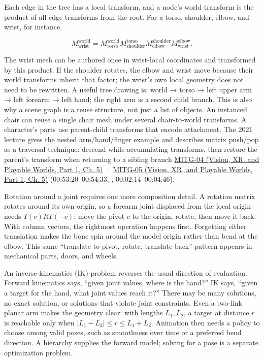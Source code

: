 Each edge in the tree has a local transform, and a node's world transform is the product of all edge transforms from the root. For a torso, shoulder, elbow, and wrist, for instance,

\[
M_{\mathrm{wrist}}^{\mathrm{world}}=
M_{\mathrm{torso}}^{\mathrm{world}}
M_{\mathrm{shoulder}}^{\mathrm{torso}}
M_{\mathrm{elbow}}^{\mathrm{shoulder}}
M_{\mathrm{wrist}}^{\mathrm{elbow}}.
\]

The wrist mesh can be authored once in wrist-local coordinates and transformed by this product. If the shoulder rotates, the elbow and wrist move because their world transforms inherit that factor; the wrist's own local geometry does not need to be rewritten. A useful tree drawing is: world → torso → left upper arm → left forearm → left hand; the right arm is a second child branch. This is also why a scene graph is a reuse structure, not just a list of objects. An instanced chair can reuse a single chair mesh under several chair-to-world transforms. A character's parts use parent-child transforms that encode attachment. The 2021 lecture gives the nested arm/hand/finger example and describes matrix push/pop as a traversal technique: descend while accumulating transforms, then restore the parent's transform when returning to a sibling branch \href{../07-Vision-XR-and-Playable-Worlds-P01/main.pdf\#nameddest=04-visual-computing-ii-ch036-mitg-04---transformations}{MITG-04 (Vision, XR, and Playable Worlds, Part 1, Ch. 5)} · \href{../07-Vision-XR-and-Playable-Worlds-P01/main.pdf\#nameddest=04-visual-computing-ii-ch036-mitg-05---hierarchical-modeling}{MITG-05 (Vision, XR, and Playable Worlds, Part 1, Ch. 5)} (00:53:20--00:54:33; , 00:02:14--00:04:46).

Rotation around a joint requires one more composition detail. A rotation matrix rotates around its own origin, so a forearm joint displaced from the local origin needs \(T(c)RT(-c)\): move the pivot \(c\) to the origin, rotate, then move it back. With column vectors, the rightmost operation happens first. Forgetting either translation makes the bone spin around the model origin rather than bend at the elbow. This same ``translate to pivot, rotate, translate back'' pattern appears in mechanical parts, doors, and wheels.

An inverse-kinematics (IK) problem reverses the usual direction of evaluation. Forward kinematics says, ``given joint values, where is the hand?'' IK says, ``given a target for the hand, what joint values reach it?'' There may be many solutions, no exact solution, or solutions that violate joint constraints. Even a two-link planar arm makes the geometry clear: with lengths \(L_1,L_2\), a target at distance \(r\) is reachable only when \(|L_1-L_2|\le r\le L_1+L_2\). Animation then needs a policy to choose among valid poses, such as smoothness over time or a preferred bend direction. A hierarchy supplies the forward model; solving for a pose is a separate optimization problem.

